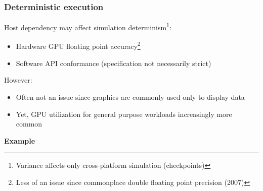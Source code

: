 \begin{frame}

\frametitle{Deterministic execution}

Host dependency may affect simulation determinism\footnote{Variance affects only cross-platform simulation (checkpoints)}:
\begin{itemize}
	\item Hardware GPU floating point accuracy\footnote{Less of an issue since commonplace double floating point precision (2007)}
	\item Software API conformance (specification not necessarily strict)
\end{itemize}

However:
\begin{itemize}
	\item Often not an issue since graphics are commonly used only to display data
	\item Yet, GPU utilization for general purpose workloads increasingly more common
\end{itemize}

\textbf{Example}

\end{frame}

